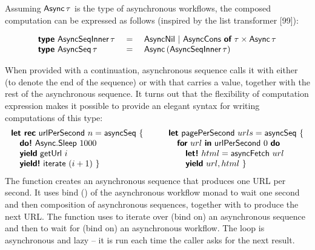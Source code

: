 \documentclass[runningheads,a4paper]{llncs}
\begin{document}
Assuming $\textnormal{\sffamily Async}\,\tau$ is the type of asynchronous workflows, the composed
computation can be expressed as follows (inspired by the list transformer [99]):

\begin{equation*}
\begin{array}{lcl}
\kvd{type}~\ident{AsyncSeqInner}\,\tau &~=~& \ident{AsyncNil} ~|~
    \ident{AsyncCons}~\kvd{of}~\tau \times \ident{Async}\,\tau \\
\kvd{type}~\ident{AsyncSeq}\,\tau &=& \ident{Async}\,(\ident{AsyncSeqInner}\,\tau)
\end{array}
\end{equation*}

When provided with a continuation, asynchronous sequence calls it with either 
(to denote the end of the sequence) or with  that carries a value, together with
the rest of the asynchronous sequence. It turns out that the flexibility of computation expression 
makes it possible to provide an elegant syntax for writing computations of this type:
%
\begin{equation*}
\begin{array}{l}
\kvd{let rec}~\ident{urlPerSecond}~n = \ident{asyncSeq}~\{ \\
\quad \kvd{do!}~\ident{Async}.\ident{Sleep}~1000 \\
\quad \kvd{yield}~\ident{getUrl}~i \\
\quad \kvd{yield!}~\ident{iterate}~(i+1) ~\}
\end{array}
\qquad
\begin{array}{l}
\kvd{let}~\ident{pagePerSecond}~urls = \ident{asyncSeq}~\{ \\
\quad \kvd{for}~url~\kvd{in}~\ident{urlPerSecond}~0~\kvd{do}\\
\quad\quad \kvd{let!}~html = \ident{asyncFetch}~url \\
\quad\quad \kvd{yield}~url, html ~\}
\end{array}
\end{equation*}
%
The  function creates an asynchronous sequence that produces one URL per
second. It uses bind () of the asynchronous workflow monad to wait one second
and then composition of asynchronous sequences, together with  to produce the 
next URL. The  function uses  to iterate over (bind on) an
asynchronous sequence and then  to wait for (bind on) an asynchronous workflow.
The  loop is asynchronous and lazy -- it is run each time the caller asks for the 
next result.
\end{document}
